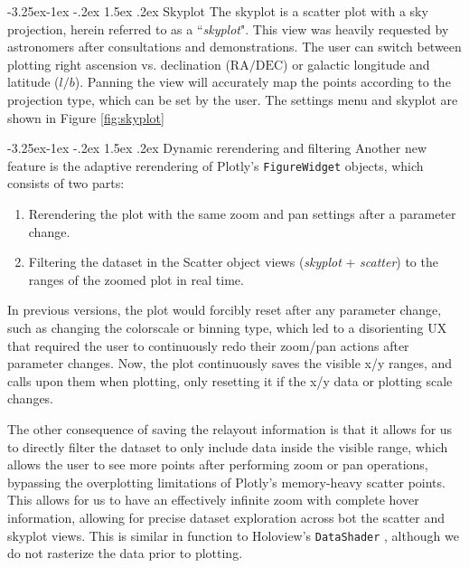 \documentclass[a4paper,10pt,twocolumn]{article}
\makeatletter
\renewcommand\paragraph{\@startsection{paragraph}{4}{\z@}%
	{-3.25ex\@plus -1ex \@minus -.2ex}%
	{1.5ex \@plus .2ex}%
	{\normalfont\normalsize\bfseries}}
\makeatother
\begin{document}
\paragraph{Skyplot}
\label{sec:skyplot}
The skyplot is a scatter plot with a sky projection, herein referred to as a ``\emph{skyplot}". This view was heavily requested by astronomers after consultations and demonstrations. The user can switch between plotting right ascension vs. declination ($\mathrm{RA / DEC} $) or galactic longitude and latitude ($l / b $). Panning the view will accurately map the points according to the projection type, which can be set by the user. The settings menu and skyplot are shown in Figure \ref{fig:skyplot}


\paragraph{Dynamic rerendering and filtering}
\label{sec:rerender}
Another new feature is the adaptive rerendering of Plotly's \texttt{FigureWidget} objects, which consists of two parts:
\begin{enumerate}
	\item Rerendering the plot with the same zoom and pan settings after a parameter change.
	\item Filtering the dataset in the Scatter object views (\emph{skyplot} + \emph{scatter}) to the ranges of the zoomed plot in real time.
\end{enumerate}

In previous versions, the plot would forcibly reset after any parameter change, such as changing the colorscale or binning type, which led to a disorienting UX that required the user to continuously redo their zoom/pan actions after parameter changes. Now, the plot continuously saves the visible x/y ranges, and calls upon them when plotting, only resetting it if the x/y data or plotting scale changes.

The other consequence of saving the relayout information is that it allows for us to directly filter the dataset to only include data inside the visible range, which allows the user to see more points after performing zoom or pan operations, bypassing the overplotting limitations of Plotly's memory-heavy scatter points. This allows for us to have an effectively infinite zoom with complete hover information, allowing for precise dataset exploration across bot the scatter and skyplot views. This is similar in function to Holoview's \texttt{DataShader} \parencite{holoviews}, although we do not rasterize the data prior to plotting.
\end{document}
